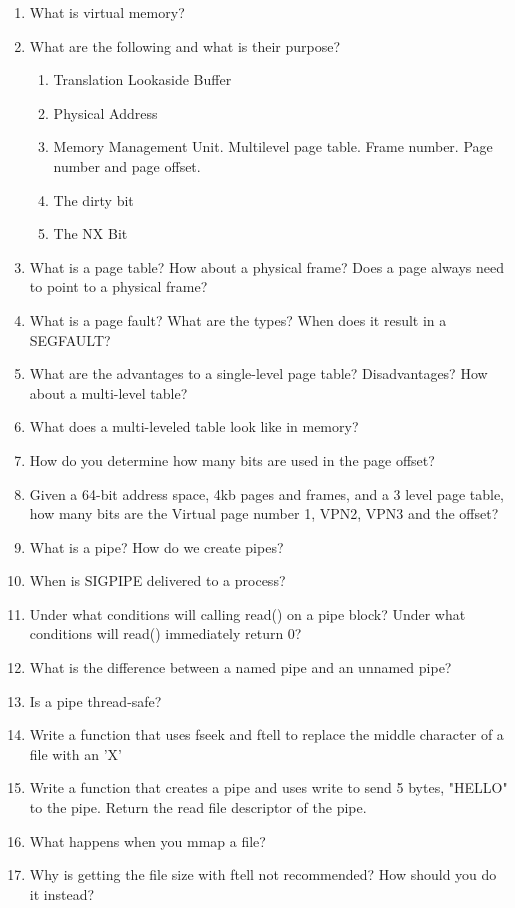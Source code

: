 \begin{enumerate}
	\item What is virtual memory?
	\item What are the following and what is their purpose?
	      \begin{enumerate}
	      	\item Translation Lookaside Buffer
	      	\item Physical Address
	      	\item Memory Management Unit. Multilevel page table. Frame number. Page number and page offset.
	      	\item The dirty bit
	      	\item The NX Bit
	      \end{enumerate}
	\item What is a page table? How about a physical frame? Does a page always need to point to a physical frame?
	\item What is a page fault? What are the types? When does it result in a SEGFAULT?
	\item What are the advantages to a single-level page table? Disadvantages? How about a multi-level table?
	\item What does a multi-leveled table look like in memory?
	\item How do you determine how many bits are used in the page offset?
	\item Given a 64-bit address space, 4kb pages and frames, and a 3 level page table, how many bits are the Virtual page number 1, VPN2, VPN3 and the offset?
	\item What is a pipe? How do we create pipes?
	\item When is SIGPIPE delivered to a process?
	\item Under what conditions will calling read() on a pipe block? Under what conditions will read() immediately return 0?
	\item What is the difference between a named pipe and an unnamed pipe?
	\item Is a pipe thread-safe?
	\item Write a function that uses fseek and ftell to replace the middle character of a file with an 'X'
	\item Write a function that creates a pipe and uses write to send 5 bytes, "HELLO" to the pipe. Return the read file descriptor of the pipe.
	\item What happens when you mmap a file?
	\item Why is getting the file size with ftell not recommended? How should you do it instead?
\end{enumerate}
	 


